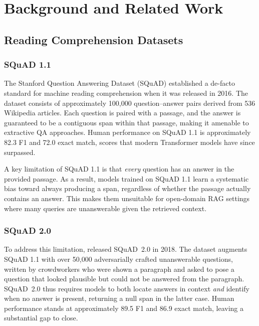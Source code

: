 \chapter{Background and Related Work}
\label{chap:background}

\section{Reading Comprehension Datasets}
\label{sec:bg_datasets}

\subsection{SQuAD 1.1}

The Stanford Question Answering Dataset (SQuAD) \cite{rajpurkar2016squad}
established a de-facto standard for machine reading comprehension when it was
released in 2016. The dataset consists of approximately 100,000 question–answer
pairs derived from 536 Wikipedia articles. Each question is paired with a
passage, and the answer is guaranteed to be a contiguous span within that
passage, making it amenable to extractive QA approaches. Human performance on
SQuAD 1.1 is approximately 82.3 F1 and 72.0 exact match, scores that modern
Transformer models have since surpassed.

A key limitation of SQuAD 1.1 is that \emph{every} question has an answer in
the provided passage. As a result, models trained on SQuAD 1.1 learn a
systematic bias toward always producing a span, regardless of whether the
passage actually contains an answer. This makes them unsuitable for open-domain
RAG settings where many queries are unanswerable given the retrieved context.

\subsection{SQuAD 2.0}

To address this limitation, \citet{rajpurkar2018squad2} released SQuAD~2.0
in 2018. The dataset augments SQuAD 1.1 with over 50,000 adversarially crafted
unanswerable questions, written by crowdworkers who were shown a paragraph and
asked to pose a question that looked plausible but could not be answered from
the paragraph. SQuAD~2.0 thus requires models to both locate answers in context
\emph{and} identify when no answer is present, returning a null span in the
latter case. Human performance stands at approximately 89.5 F1 and 86.9 exact
match, leaving a substantial gap to close.

